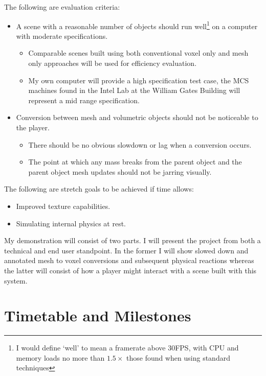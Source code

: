 The following are evaluation criteria:

\begin{itemize}

\item A scene with a reasonable number of objects should run well\footnote{I would define `well' to mean a framerate above 30FPS, with CPU and memory loads no more than $1.5\times$ those found when using standard techniques} on a computer with moderate specifications.
	\begin{itemize}
	\item Comparable scenes built using both conventional voxel only and mesh only approaches will be used for efficiency evaluation.
	\item My own computer will provide a high specification test case, the MCS machines found in the Intel Lab at the William Gates Building will represent a mid range specification.
	\end{itemize}

\item Conversion between mesh and volumetric objects should not be noticeable to the player.
	\begin{itemize}
	\item There should be no obvious slowdown or lag when a conversion occurs.
	\item The point at which any mass breaks from the parent object and the parent object mesh updates should not be jarring visually.
	\end{itemize}

\end{itemize}

The following are stretch goals to be achieved if time allows:

\begin{itemize}
\item Improved texture capabilities.

\item Simulating internal physics at rest.
\end{itemize}

My demonstration will consist of two parts. I will present the project from both a technical and end user standpoint. In the former I will show slowed down and annotated mesh to voxel conversions and subsequent physical reactions whereas the latter will consist of how a player might interact with a scene built with this system.



\section*{Timetable and Milestones}

